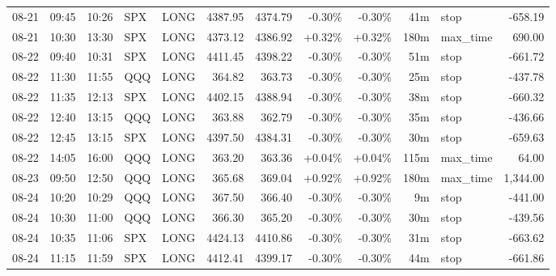 \documentclass[11pt,a4paper,twoside]{article}
\begin{document}
\begin{center}
\begin{longtable}{>{\color{txtmain}}l l l l l r r r r r >{\color{txtmain}}l r}
08-21 & 09:45 & 10:26 & SPX & LONG & 4387.95 & 4374.79 & \textcolor{lossred}{-0.30\%} & \textcolor{lossred}{-0.30\%} & 41m & stop & \textcolor{lossred}{-658.19} \\
08-21 & 10:30 & 13:30 & SPX & LONG & 4373.12 & 4386.92 & \textcolor{wingreen}{+0.32\%} & \textcolor{wingreen}{+0.32\%} & 180m & max\_time & \textcolor{wingreen}{690.00} \\
08-22 & 09:40 & 10:31 & SPX & LONG & 4411.45 & 4398.22 & \textcolor{lossred}{-0.30\%} & \textcolor{lossred}{-0.30\%} & 51m & stop & \textcolor{lossred}{-661.72} \\
08-22 & 11:30 & 11:55 & QQQ & LONG & 364.82 & 363.73 & \textcolor{lossred}{-0.30\%} & \textcolor{lossred}{-0.30\%} & 25m & stop & \textcolor{lossred}{-437.78} \\
08-22 & 11:35 & 12:13 & SPX & LONG & 4402.15 & 4388.94 & \textcolor{lossred}{-0.30\%} & \textcolor{lossred}{-0.30\%} & 38m & stop & \textcolor{lossred}{-660.32} \\
08-22 & 12:40 & 13:15 & QQQ & LONG & 363.88 & 362.79 & \textcolor{lossred}{-0.30\%} & \textcolor{lossred}{-0.30\%} & 35m & stop & \textcolor{lossred}{-436.66} \\
08-22 & 12:45 & 13:15 & SPX & LONG & 4397.50 & 4384.31 & \textcolor{lossred}{-0.30\%} & \textcolor{lossred}{-0.30\%} & 30m & stop & \textcolor{lossred}{-659.63} \\
08-22 & 14:05 & 16:00 & QQQ & LONG & 363.20 & 363.36 & \textcolor{wingreen}{+0.04\%} & \textcolor{wingreen}{+0.04\%} & 115m & max\_time & \textcolor{wingreen}{64.00} \\
08-23 & 09:50 & 12:50 & QQQ & LONG & 365.68 & 369.04 & \textcolor{wingreen}{+0.92\%} & \textcolor{wingreen}{+0.92\%} & 180m & max\_time & \textcolor{wingreen}{1,344.00} \\
08-24 & 10:20 & 10:29 & QQQ & LONG & 367.50 & 366.40 & \textcolor{lossred}{-0.30\%} & \textcolor{lossred}{-0.30\%} & 9m & stop & \textcolor{lossred}{-441.00} \\
08-24 & 10:30 & 11:00 & QQQ & LONG & 366.30 & 365.20 & \textcolor{lossred}{-0.30\%} & \textcolor{lossred}{-0.30\%} & 30m & stop & \textcolor{lossred}{-439.56} \\
08-24 & 10:35 & 11:06 & SPX & LONG & 4424.13 & 4410.86 & \textcolor{lossred}{-0.30\%} & \textcolor{lossred}{-0.30\%} & 31m & stop & \textcolor{lossred}{-663.62} \\
08-24 & 11:15 & 11:59 & SPX & LONG & 4412.41 & 4399.17 & \textcolor{lossred}{-0.30\%} & \textcolor{lossred}{-0.30\%} & 44m & stop & \textcolor{lossred}{-661.86} \\

\end{longtable}
\end{center}
\end{document}
